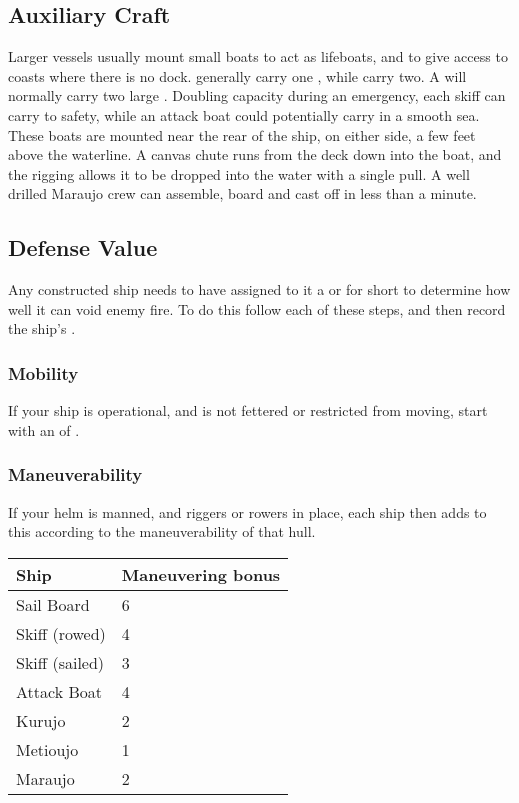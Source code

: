 \begin{multicols*}{2}
\subsection{Auxiliary Craft}
Larger vessels usually mount small boats to act as lifeboats, and to give access to coasts where there is no dock.  generally carry one , while  carry two. A  will normally carry two large . Doubling capacity during an emergency, each skiff can carry  to safety, while an attack boat could potentially carry  in a smooth sea. These boats are mounted near the rear of the ship, on either side, a few feet above the waterline. A canvas chute runs from the deck down into the boat, and the rigging allows it to be dropped into the water with a single pull. A well drilled Maraujo crew can assemble, board and cast off in less than a minute.
\subsection{Defense Value}
Any constructed ship needs to have assigned to it a  or \ADV for short to determine how well it can void enemy fire. To do this follow each of these steps, and then record the ship’s \ADV.
\subsubsection{Mobility}
If your ship is operational, and is not fettered or restricted from moving, start with an \ADV of .
\subsubsection{Maneuverability}
If your helm is manned, and riggers or rowers in place, each ship then adds to this \ADV according to the maneuverability of that hull.

\begin{normbox}
\small
\begin{tabular}{@{} l l}
\textbf{Ship} & \textbf{Maneuvering bonus}\\
\midrule
Sail Board & 6\\
Skiff (rowed) & 4\\
Skiff (sailed)  & 3\\
Attack Boat & 4\\
Kurujo & 2\\
Metioujo & 1\\
Maraujo & 2\\
\end{tabular}
\end{normbox}


\end{multicols*}
